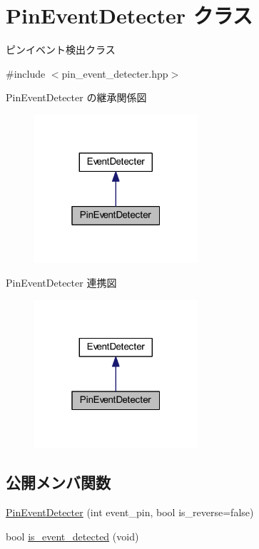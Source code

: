 \hypertarget{class_pin_event_detecter}{}\section{Pin\+Event\+Detecter クラス}
\label{class_pin_event_detecter}


ピンイベント検出クラス  




{\ttfamily \#include $<$pin\+\_\+event\+\_\+detecter.\+hpp$>$}



Pin\+Event\+Detecter の継承関係図\nopagebreak
\begin{figure}[H]
\begin{center}
\leavevmode
\includegraphics[width=172pt]{class_pin_event_detecter__inherit__graph}
\end{center}
\end{figure}


Pin\+Event\+Detecter 連携図\nopagebreak
\begin{figure}[H]
\begin{center}
\leavevmode
\includegraphics[width=172pt]{class_pin_event_detecter__coll__graph}
\end{center}
\end{figure}
\subsection*{公開メンバ関数}
\begin{DoxyCompactItemize}
\item 
\mbox{\hyperlink{class_pin_event_detecter_aa1d81fff7c1bdbbf0351466d2f5784d5}{Pin\+Event\+Detecter}} (int event\+\_\+pin, bool is\+\_\+reverse=false)
\item 
bool \mbox{\hyperlink{class_pin_event_detecter_a6e65a11e39838c30f58c66dd057abc90}{is\+\_\+event\+\_\+detected}} (void)
\end{DoxyCompactItemize}


